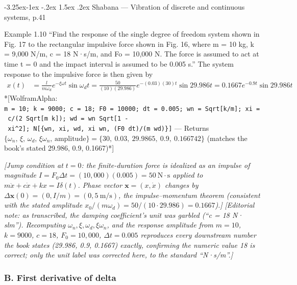 \documentclass[
  11pt,
]{article}
\makeatletter
\renewcommand\paragraph{\@startsection{paragraph}{4}{\z@}%
                                     {-3.25ex\@plus -1ex \@minus -.2ex}%
                                     {1.5ex \@plus .2ex}%
                                     {\normalfont\normalsize\bfseries}}
\makeatother
\begin{document}
\hypertarget{shabana-vibration-of-discrete-and-continuous-systems-p.41}{%
\paragraph{Shabana --- Vibration of discrete and continuous systems,
p.41}\label{shabana-vibration-of-discrete-and-continuous-systems-p.41}}

Example 1.10 ``Find the response of the single degree of freedom system
shown in Fig. 17 to the rectangular impulsive force shown in Fig. 16,
where m = 10 kg, k = 9,000 N/m, c = 18 N·s/m, and Fo = 10,000 N. The
force is assumed to act at time t = 0 and the impact interval is assumed
to be 0.005 s.'' The system response to the impulsive force is then
given by \[
\begin{aligned}
x(t) &= \frac{l}{m\omega_d} e^{-\xi\omega t} \sin \omega_d t = \frac{50}{(10)(29.986)} e^{-(0.03)(30)t} \sin 29.986t = 0.1667e^{-0.9t} \sin 29.986t
\end{aligned}
\] *{[}WolframAlpha:
\texttt{m\ =\ 10;\ k\ =\ 9000;\ c\ =\ 18;\ F0\ =\ 10000;\ dt\ =\ 0.005;\ wn\ =\ Sqrt{[}k/m{]};\ xi\ =\ c/(2\ Sqrt{[}m\ k{]});\ wd\ =\ wn\ Sqrt{[}1\ -\ xi\^{}2{]};\ N{[}\{wn,\ xi,\ wd,\ xi\ wn,\ (F0\ dt)/(m\ wd)\}{]}}
--- Returns
\(\{\omega_n,\,\xi,\,\omega_d,\,\xi\omega_n,\,\text{amplitude}\} = \{30,\ 0.03,\ 29.9865,\ 0.9,\ 0.166742\}\)
(matches the book's stated 29.986, 0.9, 0.1667)*{]}

\emph{{[}Jump condition at \(t=0\): the finite-duration force is
idealized as an impulse of magnitude
\(I=F_0\Delta t=(10{,}000)(0.005)=50\ \text{N}\cdot\text{s}\) applied to
\(m\ddot x+c\dot x+kx=I\delta(t)\). Phase vector
\(\mathbf x=(x,\dot x)\) changes by
\(\Delta\mathbf x(0)=(0,I/m)=(0,5\ \text{m/s})\), the impulse--momentum
theorem (consistent with the stated amplitude
\(x_0/(m\omega_d)=50/(10\cdot29.986)=0.1667\)).{]}} \emph{{[}Editorial
note: as transcribed, the damping coefficient's unit was garbled (``c =
18 N· slm''). Recomputing \(\omega_n, \xi, \omega_d, \xi\omega_n\), and
the response amplitude from \(m=10\), \(k=9000\), \(c=18\),
\(F_0=10{,}000\), \(\Delta t=0.005\) reproduces every downstream number
the book states (29.986, 0.9, 0.1667) exactly, confirming the numeric
value 18 is correct; only the unit label was corrected here, to the
standard ``N·s/m''.{]}}

\hypertarget{second-order-b-first-derivative}{%
\subsubsection{B. First derivative of
delta}\label{second-order-b-first-derivative}}
\end{document}

